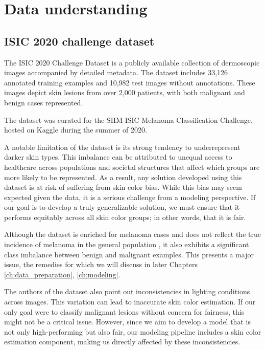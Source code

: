 \chapter{Data understanding}
\label{ch:data_understanding}

\section{ISIC 2020 challenge dataset}
The ISIC 2020 Challenge Dataset \cite{isic_2020_dataset} is a publicly available collection of dermoscopic images accompanied by detailed metadata. The dataset includes 33,126 annotated training examples and 10,982 test images without annotations. These images depict skin lesions from over 2,000 patients, with both malignant and benign cases represented.

The dataset was curated for the SIIM-ISIC Melanoma Classification Challenge, hosted on Kaggle during the summer of 2020.

A notable limitation of the dataset is its strong tendency to underrepresent darker skin types. This imbalance can be attributed to unequal access to healthcare across populations and societal structures that affect which groups are more likely to be represented. As a result, any solution developed using this dataset is at risk of suffering from skin color bias. While this bias may seem expected given the data, it is a serious challenge from a modeling perspective. If our goal is to develop a truly generalizable solution, we must ensure that it performs equitably across all skin color groups; in other words, that it is fair.

Although the dataset is enriched for melanoma cases and does not reflect the true incidence of melanoma in the general population \cite{isic_2020_dataset}, it also exhibits a significant class imbalance between benign and malignant examples. This presents a major issue, the remedies for which we will discuss in later Chapters \ref{ch:data_preparation}, \ref{ch:modeling}.

The authors of the dataset \cite{isic_2020_dataset} also point out inconsistencies in lighting conditions across images. This variation can lead to inaccurate skin color estimation. If our only goal were to classify malignant lesions without concern for fairness, this might not be a critical issue. However, since we aim to develop a model that is not only high-performing but also fair, our modeling pipeline includes a skin color estimation component, making us directly affected by these inconsistencies.


